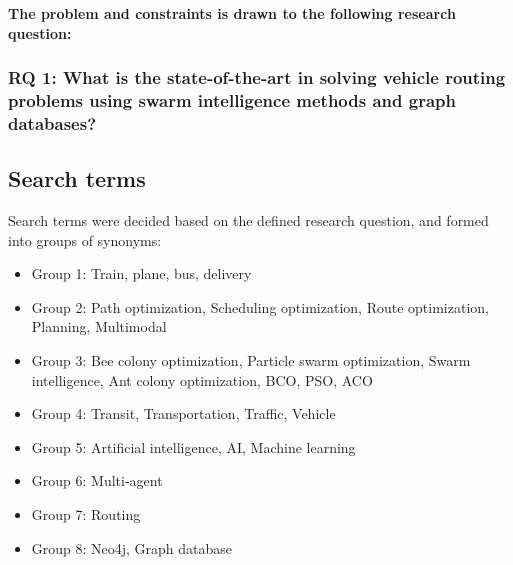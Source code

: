\textbf{The problem and constraints is drawn to the following research question:}


\subsubsection*{RQ 1: What is the state-of-the-art in solving vehicle routing problems using swarm intelligence methods and graph databases?}


\subsection{Search terms}
\label{sec:searchTerms}
Search terms were decided based on the defined research question, and formed into groups of synonyms:
\begin{itemize}
\item Group 1: Train, plane, bus, delivery
\item Group 2: Path optimization, Scheduling optimization, Route optimization, Planning, Multimodal
\item Group 3: Bee colony optimization, Particle swarm optimization, Swarm intelligence, Ant colony optimization, BCO, PSO, ACO
\item Group 4: Transit, Transportation, Traffic, Vehicle
\item Group 5: Artificial intelligence, AI, Machine learning
\item Group 6: Multi-agent
\item Group 7: Routing
\item Group 8: Neo4j, Graph database
\end{itemize}


